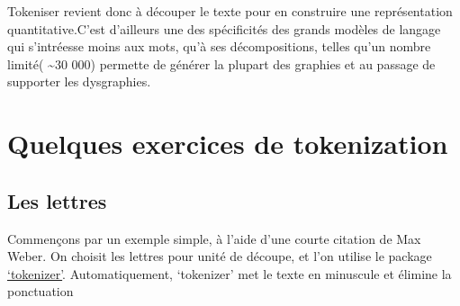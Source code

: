 \documentclass[
  letterpaper,
  DIV=11,
  numbers=noendperiod]{scrreprt}
\begin{document}
Tokeniser revient donc à découper le texte pour en construire une
représentation quantitative.C'est d'ailleurs une des spécificités des
grands modèles de langage qui s'intréesse moins aux mots, qu'à ses
décompositions, telles qu'un nombre limité( \textasciitilde30 000)
permette de générer la plupart des graphies et au passage de supporter
les dysgraphies.

\section{Quelques exercices de
tokenization}\label{quelques-exercices-de-tokenization}

\subsection{Les lettres}\label{les-lettres}

Commençons par un exemple simple, à l'aide d'une courte citation de Max
Weber. On choisit les lettres pour unité de découpe, et l'on utilise le
package
\href{https://cran.r-project.org/web/packages/tokenizers/vignettes/introduction-to-tokenizers.html}{`tokenizer'}.
Automatiquement, `tokenizer' met le texte en minuscule et élimine la
ponctuation
\end{document}
